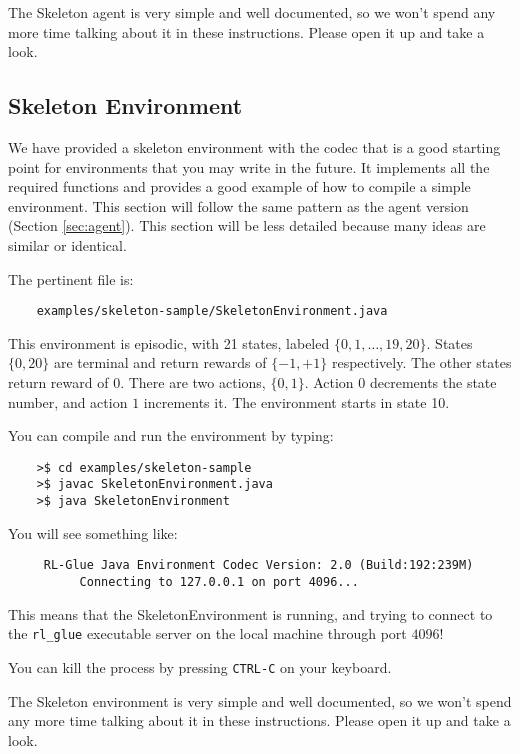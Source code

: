 \documentclass[11pt]{article}
\begin{document}
The Skeleton agent is very simple and well documented, so we won't spend any more time talking about it in these instructions.
Please open it up and take a look.

\subsection{Skeleton Environment}
\label{sec:env}
We have provided a skeleton environment with the codec that is a good starting point for environments that you may write in the future.
It implements all the required functions and provides a good example of how to compile a simple environment.  This section will follow the same 
pattern as the agent version (Section \ref{sec:agent}).  This section will be less detailed because many ideas are similar or identical.

The pertinent file is:
\begin{verbatim}
	examples/skeleton-sample/SkeletonEnvironment.java
\end{verbatim}

This environment is episodic, with 21 states, labeled $\{0, 1,\ldots,19,20\}$. States $\{0, 20\}$ are terminal and return rewards of $\{-1, +1\}$ respectively.  The other states return reward of $0$.
There are two actions, $\{0, 1\}$.  Action $0$ decrements the state number, and action $1$ increments it. The environment starts in state 10.

You can compile and run the environment by typing:
\begin{verbatim}
	>$ cd examples/skeleton-sample
	>$ javac SkeletonEnvironment.java
	>$ java SkeletonEnvironment
\end{verbatim}

You will see something like:
\begin{verbatim}
     RL-Glue Java Environment Codec Version: 2.0 (Build:192:239M)
          Connecting to 127.0.0.1 on port 4096...
\end{verbatim}

This means that the SkeletonEnvironment is running, and trying to connect to the \texttt{rl\_glue} executable server on the local machine through port $4096$! 

You can kill the process by pressing \texttt{CTRL-C} on your keyboard.


The Skeleton environment is very simple and well documented, so we won't spend any more time talking about it in these instructions.
Please open it up and take a look.
\end{document}
